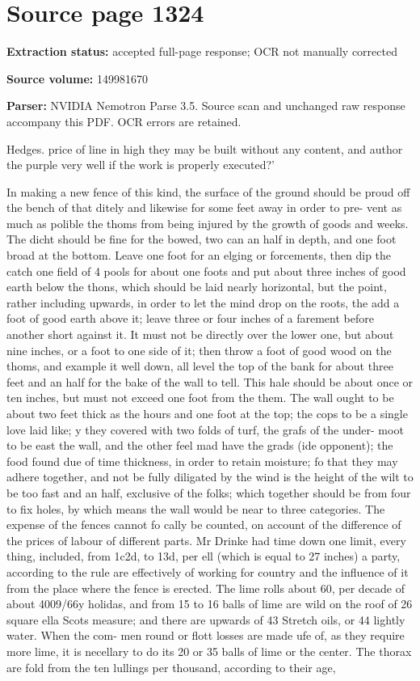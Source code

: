 \clearpage
\section{Source page 1324}
\textbf{Extraction status:} accepted full-page response; OCR not manually corrected\par
\textbf{Source volume:} 149981670\par
\textbf{Parser:} NVIDIA Nemotron Parse 3.5. Source scan and unchanged raw response accompany this PDF. OCR errors are retained.\par\medskip
Hedges. price of line in high they may be built without any content, and author the purple very well if the work is properly executed?’\par\medskip
In making a new fence of this kind, the surface of the ground should be proud off the bench of that ditely and likewise for some feet away in order to pre- vent as much as polible the thoms from being injured by the growth of goods and weeks. The dicht should be fine for the bowed, two can an half in depth, and one foot broad at the bottom. Leave one foot for an elging or forcements, then dip the catch one field of 4 pools for about one foots and put about three inches of good earth below the thons, which should be laid nearly horizontal, but the point, rather including upwards, in order to let the mind drop on the roots, the add a foot of good earth above it; leave three or four inches of a farement before another short against it. It must not be directly over the lower one, but about nine inches, or a foot to one side of it; then throw a foot of good wood on the thoms, and example it well down, all level the top of the bank for about three feet and an half for the bake of the wall to tell. This hale should be about once or ten inches, but must not exceed one foot from the them. The wall ought to be about two feet thick as the hours and one foot at the top; the cops to be a single love laid like; y they covered with two folds of turf, the grafs of the under- moot to be east the wall, and the other feel mad have the grads (ide opponent); the food found due of time thickness, in order to retain moisture; fo that they may adhere together, and not be fully diligated by the wind is the height of the wilt to be too fast and an half, exclusive of the folks; which together should be from four to fix holes, by which means the wall would be near to three categories. The expense of the fences cannot fo cally be counted, on account of the difference of the prices of labour of different parts. Mr Drinke had time down one limit, every thing, included, from 1c2d, to 13d, per ell (which is equal to 27 inches) a party, according to the rule are effectively of working for country and the influence of it from the place where the fence is erected. The lime rolls about 60, per decade of about 4009/66y holidas, and from 15 to 16 balls of lime are wild on the roof of 26 square ella Scots measure; and there are upwards of 43 Stretch oils, or 44 lightly water. When the com- men round or flott losses are made ufe of, as they require more lime, it is necellary to do its 20 or 35 balls of lime or the center. The thorax are fold from the ten lullings per thousand, according to their age, 